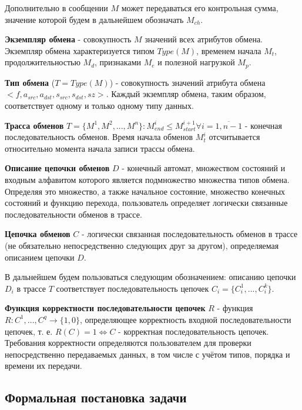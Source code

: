 
Дополнительно в сообщении $M$ может передаваться его контрольная сумма, 
значение которой будем в дальнейшем обозначать $M_{ch}$.

\textbf{Экземпляр обмена} - совокупность $M$ значений всех атрибутов обмена. 
Экземпляр обмена характеризуется типом $Type(M)$, временем начала $M_t$, 
продолжительностью $M_d$, признаками $M_e$ и полезной нагрузкой $M_p$.

\textbf{Тип обмена} ($T = Type(M)$) - совокупность значений атрибута обмена 
$<f, a_{src}, a_{dst}, s_{src}, s_{dst}, sz>$. Каждый экземпляр обмена, таким 
образом, соответствует одному и только одному типу данных.

\textbf{Трасса обменов} $T = \{  M^1, M^2, ..., M^n \} : M^i_{end} \leq 
M^{i+1}_{start} \forall i = \overline{1,n-1}$ - конечная последовательность 
обменов. Время начала обменов $M^i_t$ отсчитывается относительно момента начала 
записи трассы обмена.


\textbf{Описание цепочки обменов} $D$ - конечный автомат, множеством состояний 
и входным алфавитом которого является подмножество множества типов обмена. 
Определяя это множество, а также начальное состояние, множество конечных 
состояний и функцию перехода, пользователь определяет логически связанные 
последовательности обменов в трассе.

\textbf{Цепочка обменов} $C$ - логически связанная последовательность обменов 
в трассе (не обязательно непосредственно следующих друг за другом), 
определяемая описанием цепочки $D$.

В дальнейшем будем пользоваться следующим обозначением: описанию цепочки $D_i$ 
в трассе $T$ соответствует последовательность цепочек $C_i = \{ C_i^1, ..., 
C_i^k \}$.


\textbf{Функция корректности последовательности цепочек} $R$ - функция $R: 
{C^1, ..., C^q} \rightarrow \{ 1, 0 \}$, определяющее корректность входной 
последовательности цепочек, т. е. $R(C) = 1 \Leftrightarrow C$ - корректная 
последовательность цепочек. Требования корректности определяются пользователем 
для проверки непосредственно передаваемых данных, в том числе с учётом 
типов, порядка и времени их передачи.

\subsection{Формальная постановка задачи}

